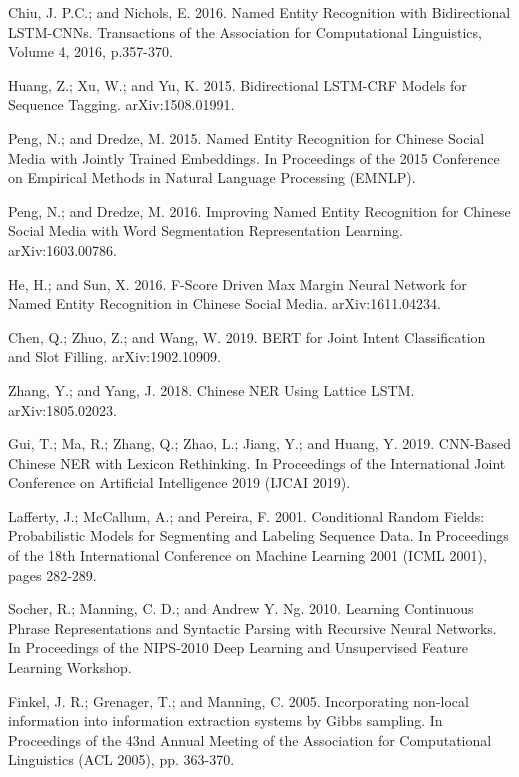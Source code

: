 \documentclass[letterpaper]{article} %
\begin{document}
\smallskip \noindent
Chiu, J. P.C.; and Nichols, E. 2016. Named Entity Recognition with Bidirectional LSTM-CNNs. Transactions of the Association for Computational Linguistics, Volume 4, 2016, p.357-370. 

\smallskip \noindent
Huang, Z.; Xu, W.; and Yu, K. 2015. Bidirectional LSTM-CRF Models for Sequence Tagging. arXiv:1508.01991. 

\smallskip \noindent
Peng, N.; and Dredze, M. 2015. Named Entity Recognition for Chinese Social Media with Jointly Trained Embeddings. In Proceedings of the 2015 Conference on Empirical Methods in Natural Language Processing (EMNLP). 

\smallskip \noindent
Peng, N.; and Dredze, M. 2016. Improving Named Entity Recognition for Chinese Social Media with Word Segmentation Representation Learning. arXiv:1603.00786. 

\smallskip \noindent
He, H.; and Sun, X. 2016. F-Score Driven Max Margin Neural Network for Named Entity Recognition in Chinese Social Media. 	arXiv:1611.04234. 

\smallskip \noindent
Chen, Q.; Zhuo, Z.; and Wang, W. 2019. BERT for Joint Intent Classification and Slot Filling. arXiv:1902.10909. 

\smallskip \noindent
Zhang, Y.; and Yang, J. 2018. Chinese NER Using Lattice LSTM. arXiv:1805.02023. 

\smallskip \noindent
Gui, T.; Ma, R.; Zhang, Q.; Zhao, L.; Jiang, Y.; and Huang, Y. 2019. CNN-Based Chinese NER with Lexicon Rethinking. In Proceedings of the International Joint Conference on Artificial Intelligence 2019 (IJCAI 2019). 

\smallskip \noindent
Lafferty, J.; McCallum, A.; and Pereira, F. 2001. Conditional Random Fields: Probabilistic Models for Segmenting and Labeling Sequence Data. In Proceedings of the 18th International Conference on Machine Learning 2001 (ICML 2001), pages 282-289.

\smallskip \noindent
Socher, R.; Manning, C. D.; and Andrew Y. Ng. 2010. Learning Continuous Phrase Representations and Syntactic Parsing with Recursive Neural Networks. In Proceedings of the NIPS-2010 Deep Learning and Unsupervised Feature Learning Workshop. 

\smallskip \noindent
Finkel, J. R.; Grenager, T.; and Manning, C. 2005. Incorporating non-local information into information extraction systems by Gibbs sampling. In Proceedings of the 43nd Annual Meeting of the Association for Computational Linguistics (ACL 2005), pp. 363-370. 
\end{document}
